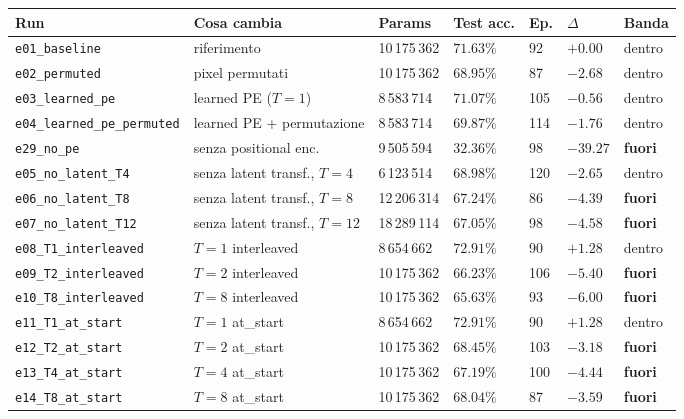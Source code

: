 \documentclass[
  11pt,
]{article}
\begin{document}
\begin{center}
{\scriptsize
\begin{tabular}{@{}p{3.1cm}p{3.3cm}p{1.5cm}p{1.2cm}p{0.7cm}p{1.0cm}p{0.9cm}@{}}
\toprule
\textbf{Run} & \textbf{Cosa cambia} & \textbf{Params} & \textbf{Test acc.} & \textbf{Ep.} & \textbf{$\Delta$} & \textbf{Banda} \\
\midrule
\texttt{e01\_baseline} & riferimento & 10\,175\,362 & $71.63\%$ & 92 & $+0.00$ & dentro \\
\texttt{e02\_permuted} & pixel permutati & 10\,175\,362 & $68.95\%$ & 87 & $-2.68$ & dentro \\
\texttt{e03\_learned\_pe} & learned PE ($T{=}1$) & 8\,583\,714 & $71.07\%$ & 105 & $-0.56$ & dentro \\
\texttt{e04\_learned\_pe\_permuted} & learned PE + permutazione & 8\,583\,714 & $69.87\%$ & 114 & $-1.76$ & dentro \\
\texttt{e29\_no\_pe} & senza positional enc. & 9\,505\,594 & $32.36\%$ & 98 & $-39.27$ & \textbf{fuori} \\
\texttt{e05\_no\_latent\_T4} & senza latent transf., $T{=}4$ & 6\,123\,514 & $68.98\%$ & 120 & $-2.65$ & dentro \\
\texttt{e06\_no\_latent\_T8} & senza latent transf., $T{=}8$ & 12\,206\,314 & $67.24\%$ & 86 & $-4.39$ & \textbf{fuori} \\
\texttt{e07\_no\_latent\_T12} & senza latent transf., $T{=}12$ & 18\,289\,114 & $67.05\%$ & 98 & $-4.58$ & \textbf{fuori} \\
\texttt{e08\_T1\_interleaved} & $T{=}1$ interleaved & 8\,654\,662 & $72.91\%$ & 90 & $+1.28$ & dentro \\
\texttt{e09\_T2\_interleaved} & $T{=}2$ interleaved & 10\,175\,362 & $66.23\%$ & 106 & $-5.40$ & \textbf{fuori} \\
\texttt{e10\_T8\_interleaved} & $T{=}8$ interleaved & 10\,175\,362 & $65.63\%$ & 93 & $-6.00$ & \textbf{fuori} \\
\texttt{e11\_T1\_at\_start} & $T{=}1$ at\_start & 8\,654\,662 & $72.91\%$ & 90 & $+1.28$ & dentro \\
\texttt{e12\_T2\_at\_start} & $T{=}2$ at\_start & 10\,175\,362 & $68.45\%$ & 103 & $-3.18$ & \textbf{fuori} \\
\texttt{e13\_T4\_at\_start} & $T{=}4$ at\_start & 10\,175\,362 & $67.19\%$ & 100 & $-4.44$ & \textbf{fuori} \\
\texttt{e14\_T8\_at\_start} & $T{=}8$ at\_start & 10\,175\,362 & $68.04\%$ & 87 & $-3.59$ & \textbf{fuori} \\

\end{tabular}}
\end{center}
\end{document}
